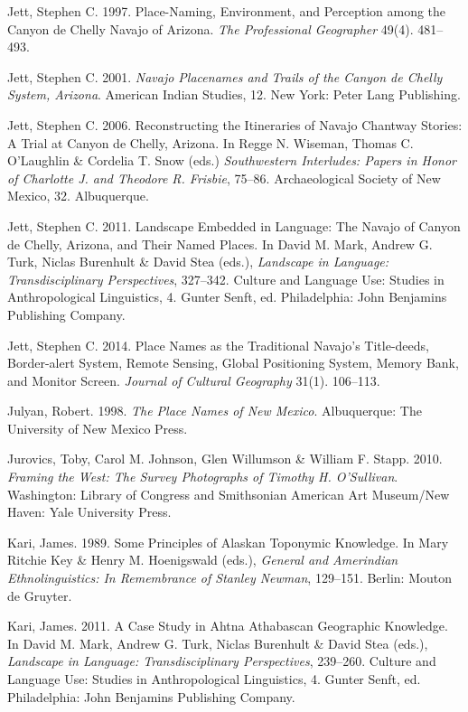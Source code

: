 Jett, Stephen C.  1997.  Place-Naming, Environment, and Perception among the Canyon de Chelly Navajo of Arizona.  \textit{The Professional Geographer} 49(4). 481--493.

Jett, Stephen C.  2001. \textit{Navajo Placenames and Trails of the Canyon de Chelly System, Arizona}.  American Indian Studies, 12.  New York:  Peter Lang Publishing.

Jett, Stephen C.  2006.  Reconstructing the Itineraries of Navajo Chantway Stories: A Trial at Canyon de Chelly, Arizona.  In Regge N. Wiseman, Thomas C. O’Laughlin \& Cordelia T. Snow (eds.) \textit{Southwestern Interludes: Papers in Honor of Charlotte J. and Theodore R. Frisbie},  75--86.  Archaeological Society of New Mexico, 32.  Albuquerque.

Jett, Stephen C.  2011.  Landscape Embedded in Language: The Navajo of Canyon de Chelly, Arizona, and Their Named Places. In David M. Mark, Andrew G. Turk, Niclas Burenhult \& David Stea (eds.), \textit{Landscape in Language: Transdisciplinary Perspectives}, 327--342.  Culture and Language Use: Studies in Anthropological Linguistics, 4.  Gunter Senft, ed.  Philadelphia:  John Benjamins Publishing Company.

Jett, Stephen C.  2014.  Place Names as the Traditional Navajo’s Title-deeds, Border-alert System, Remote Sensing, Global Positioning System, Memory Bank, and Monitor Screen.  \textit{Journal of Cultural Geography} 31(1). 106--113.

Julyan, Robert. 1998. \textit{The Place Names of New Mexico}.  Albuquerque:  The University of New Mexico Press.

Jurovics, Toby, Carol M. Johnson, Glen Willumson \& William F. Stapp. 2010. \textit{Framing the West: The Survey Photographs of Timothy H. O’Sullivan}.  Washington:  Library of Congress and Smithsonian American Art Museum/New Haven:  Yale University Press.

Kari, James. 1989.  Some Principles of Alaskan Toponymic Knowledge.  In Mary Ritchie Key \& Henry M. Hoenigswald (eds.), \textit{General and Amerindian Ethnolinguistics: In Remembrance of Stanley Newman},  129--151.  Berlin:  Mouton de Gruyter.


Kari, James. 2011.  A Case Study in Ahtna Athabascan Geographic Knowledge.  In David M. Mark, Andrew G. Turk, Niclas Burenhult \& David Stea (eds.), \textit{Landscape in Language: Transdisciplinary Perspectives},  239--260.  Culture and Language Use: Studies in Anthropological Linguistics, 4.  Gunter Senft, ed.  Philadelphia:  John Benjamins Publishing Company.

